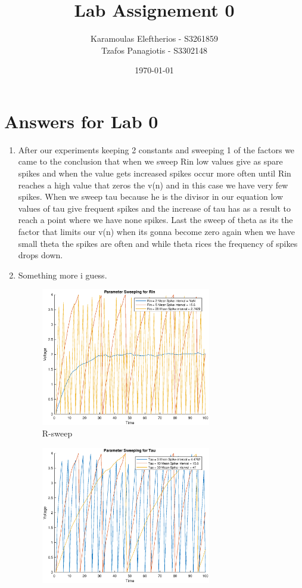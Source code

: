 \documentclass{article}
\title{Lab Assignement 0}
\date{\today}
\author{
	Karamoulas Eleftherios - S3261859\\
	Tzafos Panagiotis - S3302148\\
}
\begin{document}
\maketitle
\section{Answers for Lab 0}
\begin{enumerate}
\item
After our experiments keeping 2 constants and sweeping 1 of the factors we came to the conclusion that when we sweep Rin low values give as spare spikes and when the value gets increased spikes occur more often until Rin reaches a high value that zeros the v(n) and in this case we have very few spikes. When we sweep tau because he is the divisor in our equation low values of tau give frequent spikes and the increase of tau has as a result to reach a point where we have none spikes. Last the sweep of theta as its the factor that limits our v(n) when its gonna become zero again when we have small theta the spikes are often and while theta rices the frequency of spikes drops down.
\item
Something more i guess.
\begin{figure}[!h]
    \centering
    \includegraphics[width=0.7\textwidth]{im/Rin-Sweep.eps}
    \caption{R-sweep}
    \label{fig:plot}
  \end{figure}
  \begin{figure}[!h]
    \centering
    \includegraphics[width=0.7\textwidth]{im/Tau-Sweep.eps}

\end{figure}
\end{enumerate}
\end{document}
